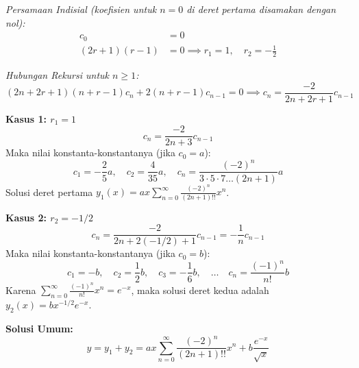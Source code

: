 \documentclass[11pt,a4paper]{article}
\begin{document}
\begin{enumerate}
        \textit{Persamaan Indisial (koefisien untuk $n=0$ di deret pertama disamakan dengan nol):}
        \begin{align*}
          [2(0+r)(r-1) + r - 1] c_0 & = 0                                            \\
          (2r+1)(r-1)               & = 0 \implies r_1 = 1, \quad r_2 = -\frac{1}{2}
        \end{align*}

        \textit{Hubungan Rekursi untuk $n \geq 1$:}
        \begin{equation*}
          (2n+2r+1)(n+r-1) c_n + 2(n+r-1) c_{n-1} = 0 \implies c_n = \frac{-2}{2n+2r+1} c_{n-1}
        \end{equation*}

        \textbf{Kasus 1: $r_1 = 1$}
        \begin{equation*}
          c_n = \frac{-2}{2n+3} c_{n-1}
        \end{equation*}
        Maka nilai konstanta-konstantanya (jika $c_0 = a$):
        \begin{equation*}
          c_1 = -\frac{2}{5}a, \quad c_2 = \frac{4}{35}a, \quad c_n = \frac{(-2)^n}{3 \cdot 5 \cdot 7 \dots (2n+1)} a
        \end{equation*}
        Solusi deret pertama $y_1(x) = a x \sum_{n=0}^{\infty} \frac{(-2)^n}{(2n+1)!!} x^n$.

        \textbf{Kasus 2: $r_2 = -1/2$}
        \begin{equation*}
          c_n = \frac{-2}{2n + 2(-1/2) + 1} c_{n-1} = -\frac{1}{n} c_{n-1}
        \end{equation*}
        Maka nilai konstanta-konstantanya (jika $c_0 = b$):
        \begin{equation*}
          c_1 = -b, \quad c_2 = \frac{1}{2}b, \quad c_3 = -\frac{1}{6}b, \quad \dots \quad c_n = \frac{(-1)^n}{n!} b
        \end{equation*}
        Karena $\sum_{n=0}^\infty \frac{(-1)^n}{n!} x^n = e^{-x}$, maka solusi deret kedua adalah $y_2(x) = b x^{-1/2} e^{-x}$.

        \textbf{Solusi Umum:}
        \begin{equation*}
          y = y_1 + y_2 = a x \sum_{n=0}^{\infty} \frac{(-2)^n}{(2n+1)!!} x^n + b \frac{e^{-x}}{\sqrt{x}}
        \end{equation*}

\end{enumerate}
\end{document}

